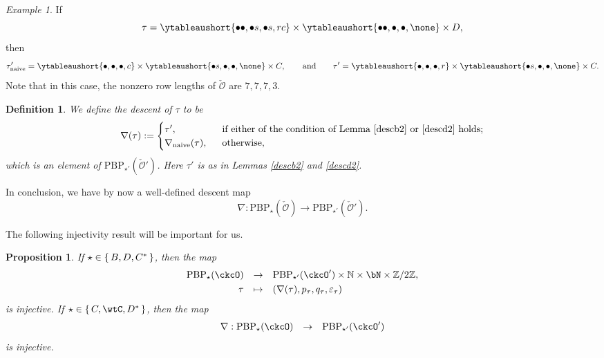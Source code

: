 \documentclass[12pt,a4paper]{amsart}
\newcommand{\BN}{{\mathbb {N}}}
\newcommand{\CO}{{\mathcal {O}}}
\newcommand{\Z}{\mathbb{Z}}
\def\DD{\nabla}
\numberwithin{equation}{section}
\newtheorem{prop}[thm]{Proposition}
\newtheorem{defn}[thm]{Definition}
\theoremstyle{remark}
\newtheorem*{Example}{Example}
\let\ytb=\ytableaushort
\def\ckcOp{\ckcO^{\prime}}
\def\PBP{\mathrm{PBP}}
\begin{document}
\begin{Example}
 If
 \[
 \tau= \ytb{\bullet\bullet, \bullet s, \bullet s, r c} \times \ytb{\bullet\bullet,\bullet,\bullet, \none }\times
  D,
 \]
 then
\[
 \tau'_{\mathrm{naive}}=\ytb{\bullet, \bullet , \bullet ,  c} \times \ytb{\bullet s,\bullet,\bullet, \none } \times
  C,\qquad\textrm{and}\qquad \tau'=\ytb{\bullet, \bullet , \bullet ,  r} \times \ytb{\bullet s,\bullet,\bullet, \none } \times
  C.
 \]
 Note that in this case, the nonzero row lengths of $\check \CO$ are $7,7,7,3$.
\end{Example}

\begin{defn}
We define the descent of $\tau$ to be
\[
  \nabla(\tau):= \begin{cases}
  \tau', & \ \text{ if either of the condition of Lemma \ref{descb2}  or \ref{descd2} holds}; \\
  \nabla_{\mathrm{naive}}( \tau), & \ \text{ otherwise},
\end{cases}
\]
which is an element of $  \mathrm{PBP}_{\star'}(\check \CO')$.
Here $\tau'$ is as in Lemmas  \ref{descb2} and \ref{descd2}.
\end{defn}
In conclusion, we have by now a well-defined descent map
\[
\nabla: \mathrm{PBP}_{\star}(\check \CO)\rightarrow \mathrm{PBP}_{\star'}(\check \CO').
\]


The following injectivity result will be important for us.

\begin{prop}\label{prop:DD.BDinj}
If $\star \in \set{B, D,C^*}$, then the map
\begin{equation}
  \begin{array}{rcl}
   \PBP_\star(\ckcO)&\rightarrow&
   \PBP_{\star'}(\ckcOp)\times \BN\times \bN\times \Z/2\Z, \smallskip\\
   \tau& \mapsto & (\DD(\tau), p_\tau, q_\tau, \varepsilon_\tau)
   \end{array}
\end{equation}
is injective. If $\star \in  \set{C,\wtC,D^*}$, then the map
\begin{equation}
  \begin{array}{rcl}
  \DD:  \PBP_\star(\ckcO)&\rightarrow&
   \PBP_{\star'}(\ckcOp)
   \end{array}
\end{equation}
is injective.

\end{prop}
\end{document}
